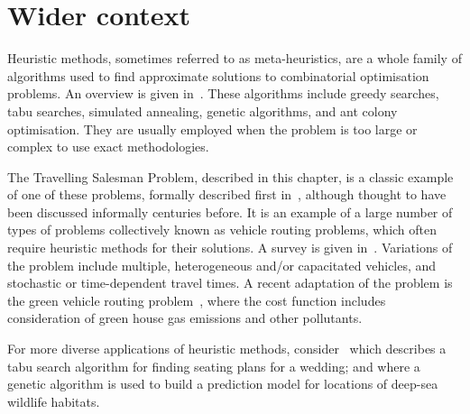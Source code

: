 \section{Wider context}\label{sec:heuristics_wider_context}

Heuristic methods, sometimes referred to as meta-heuristics, are a whole family
of algorithms used to find approximate solutions to combinatorial optimisation
problems. An overview is given in~\cite{bozorg2017meta}. These algorithms
include greedy searches, tabu searches, simulated annealing, genetic algorithms,
and ant colony optimisation. They are usually employed when the problem is too
large or complex to use exact methodologies.

The Travelling Salesman Problem, described in this chapter, is a classic example
of one of these problems, formally described first in~\cite{menger1932},
although thought to have been discussed informally centuries before.
It is an example of a large number of types of problems collectively known as
vehicle routing problems, which often require heuristic methods for their
solutions. A survey is given in~\cite{braekers2016vehicle}. Variations of
the problem include multiple, heterogeneous and/or capacitated vehicles, and
stochastic or time-dependent travel times. A recent adaptation of the problem
is the green vehicle routing problem~\cite{moghdani2021green}, where the
cost function includes consideration of green house gas emissions and other
pollutants.

For more diverse applications of heuristic methods,
consider~\cite{lewis2016creating} which describes a tabu search algorithm
for finding seating plans for a wedding; and \cite{tong2013modeling} where
a genetic algorithm is used to build a prediction model for locations of
deep-sea wildlife habitats.
